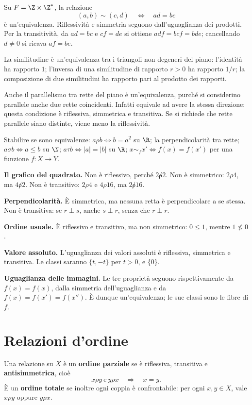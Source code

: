 \begin{esempio}
Su $F=\Z\times\Z^*$, la relazione
\[
(a,b)\sim(c,d)\quad\Longleftrightarrow\quad ad=bc
\]
è un'equivalenza. Riflessività e simmetria seguono dall'uguaglianza dei prodotti. Per la transitività, da $ad=bc$ e $cf=de$ si ottiene $adf=bcf=bde$; cancellando $d\ne0$ si ricava $af=be$.

La similitudine è un'equivalenza tra i triangoli non degeneri del piano: l'identità ha rapporto $1$; l'inversa di una similitudine di rapporto $r>0$ ha rapporto $1/r$; la composizione di due similitudini ha rapporto pari al prodotto dei rapporti.

Anche il parallelismo tra rette del piano è un'equivalenza, purché si considerino parallele anche due rette coincidenti. Infatti equivale ad avere la stessa direzione: questa condizione è riflessiva, simmetrica e transitiva. Se si richiede che rette parallele siano distinte, viene meno la riflessività.
\end{esempio}

\begin{esercizio}
Stabilire se sono equivalenze: $a\rho b\iff b=a^2$ su $\R$; la perpendicolarità tra rette; $a\sigma b\iff a\le b$ su $\N$; $a\tau b\iff |a|=|b|$ su $\R$; $x\sim_f x'\iff f(x)=f(x')$ per una funzione $f:X\to Y$.
\end{esercizio}
\begin{svolgimento}
\textbf{Il grafico del quadrato.} Non è riflessivo, perché $2\not\rho2$. Non è simmetrico: $2\rho4$, ma $4\not\rho2$. Non è transitivo: $2\rho4$ e $4\rho16$, ma $2\not\rho16$.

\textbf{Perpendicolarità.} È simmetrica, ma nessuna retta è perpendicolare a se stessa. Non è transitiva: se $r\perp s$, anche $s\perp r$, senza che $r\perp r$.

\textbf{Ordine usuale.} È riflessivo e transitivo, ma non simmetrico: $0\le1$, mentre $1\nleq0$.

\textbf{Valore assoluto.} L'uguaglianza dei valori assoluti è riflessiva, simmetrica e transitiva. Le classi saranno $\{t,-t\}$ per $t>0$, e $\{0\}$.

\textbf{Uguaglianza delle immagini.} Le tre proprietà seguono rispettivamente da $f(x)=f(x)$, dalla simmetria dell'uguaglianza e da $f(x)=f(x')=f(x'')$. È dunque un'equivalenza; le sue classi sono le fibre di $f$.
\end{svolgimento}

\section{Relazioni d'ordine}
\begin{definizione}
Una relazione su $X$ è un \textbf{ordine parziale} se è riflessiva, transitiva e \textbf{antisimmetrica}, cioè
\[
x\rho y\ \text{e}\ y\rho x\quad\Longrightarrow\quad x=y.
\]
È un \textbf{ordine totale} se inoltre ogni coppia è confrontabile: per ogni $x,y\in X$, vale $x\rho y$ oppure $y\rho x$.
\end{definizione}

